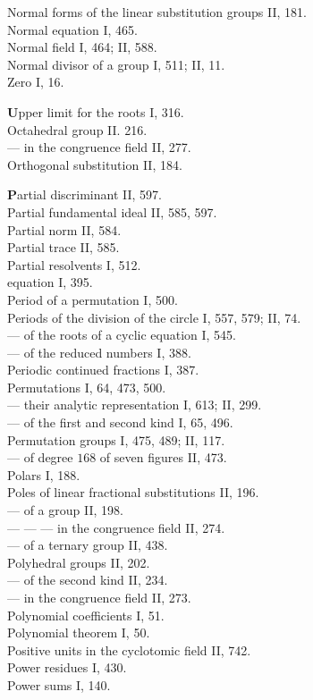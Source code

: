 
\noindent
Normal forms of the linear substitution groups II, 181.\\
Normal equation I, 465.\\
Normal field I, 464; II, 588.\\
Normal divisor of a group I, 511; II, 11.\\
Zero I, 16.

\medskip
\noindent
\textbf{U}pper limit for the roots I, 316.\\
Octahedral group II. 216.\\ %
--- in the congruence field II, 277.\\
Orthogonal substitution II, 184.

\medskip
\noindent
\textbf{P}artial discriminant II, 597.\\
Partial fundamental ideal II, 585, 597.\\
Partial norm II, 584.\\
Partial trace II, 585.\\
Partial resolvents I, 512.\\
 equation I, 395.\\
Period of a permutation I, 500.\\
Periods of the division of the circle I, 557, 579; II, 74.\\
--- of the roots of a cyclic equation I, 545.\\
--- of the reduced numbers I, 388.\\
Periodic continued fractions I, 387.\\
Permutations I, 64, 473, 500.\\
--- their analytic representation I, 613; II, 299.\\
--- of the first and second kind I, 65, 496.\\
Permutation groups I, 475, 489; II, 117.\\
--- of degree $168$ of seven figures II, 473.\\
Polars I, 188.\\
Poles of linear fractional substitutions II, 196.\\
--- of a group II, 198.\\
--- --- --- in the congruence field II, 274.\\
--- of a ternary group II, 438.\\
Polyhedral groups II, 202.\\
--- of the second kind II, 234.\\
--- in the congruence field II, 273.\\
Polynomial coefficients I, 51.\\
Polynomial theorem I, 50.\\
Positive units in the cyclotomic field II, 742.\\
Power residues I, 430.\\
Power sums I, 140.

